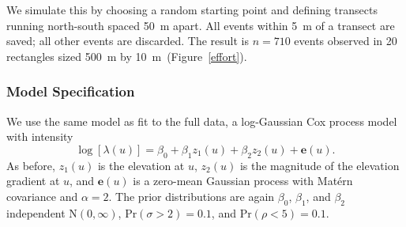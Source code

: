 \documentclass[]{interact}
\begin{document}
We simulate this by choosing a random starting point and defining transects
running north-south spaced 50~m apart. All events within 5~m of a transect are
saved; all other events are discarded. The result is \(n = 710\) events
observed in 20 rectangles sized 500~m by 10~m~(Figure~\ref{effort}).


\subsubsection{Model Specification}
\label{xsectmodel}

We use the same model as fit to the full data, a log-Gaussian Cox process model
with intensity
\begin{displaymath}
\log\left[\lambda(u)\right] = \beta_{0} + \beta_{1} z_{1}(u)
+ \beta_{2} z_{2}(u) + \mathbf{e}(u).
\end{displaymath}
As before, \(z_{1}(u)\) is the elevation at \(u\), \(z_{2}(u)\) is the
magnitude of the elevation gradient at \(u\), and \(\mathbf{e}(u)\) is a
zero-mean Gaussian process with Mat\'{e}rn covariance and \(\alpha = 2\).
The prior distributions are again \(\beta_{0}\), \(\beta_{1}\), and
\(\beta_{2}\) independent \(\mathrm{N}(0, \infty)\),
\(\mathrm{Pr}(\sigma > 2) = 0.1\), and \(\mathrm{Pr}(\rho < 5) = 0.1\).
\end{document}
